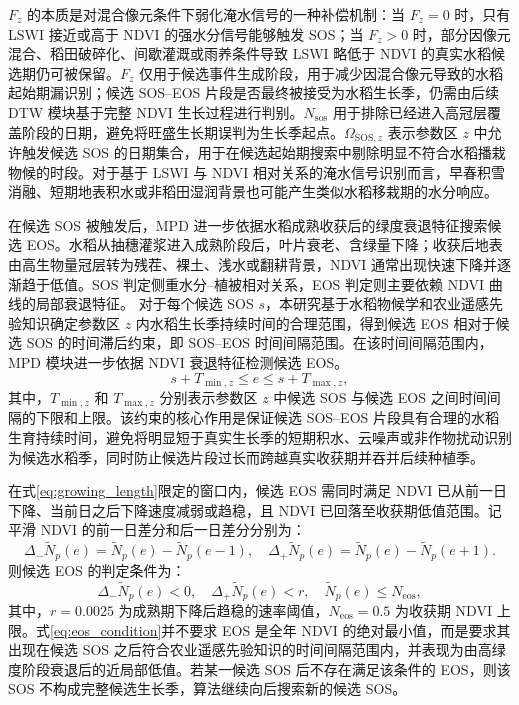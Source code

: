 \(F_z\) 的本质是对混合像元条件下弱化淹水信号的一种补偿机制：当 \(F_z=0\) 时，只有 LSWI 接近或高于 NDVI 的强水分信号能够触发 SOS；当 \(F_z>0\) 时，部分因像元混合、稻田破碎化、间歇灌溉或雨养条件导致 LSWI 略低于 NDVI 的真实水稻候选期仍可被保留。\(F_z\) 仅用于候选事件生成阶段，用于减少因混合像元导致的水稻起始期漏识别；候选 SOS--EOS 片段是否最终被接受为水稻生长季，仍需由后续 DTW 模块基于完整 NDVI 生长过程进行判别。\(N_{\mathrm{sos}}\) 用于排除已经进入高冠层覆盖阶段的日期，避免将旺盛生长期误判为生长季起点。\(\Omega_{\mathrm{SOS},z}\) 表示参数区 \(z\) 中允许触发候选 SOS 的日期集合，用于在候选起始期搜索中剔除明显不符合水稻播栽物候的时段。对于基于 LSWI 与 NDVI 相对关系的淹水信号识别而言，早春积雪消融、短期地表积水或非稻田湿润背景也可能产生类似水稻移栽期的水分响应\cite{Zhang2015ISPRS,Qin2015ISPRS}。

在候选 SOS 被触发后，MPD 进一步依据水稻成熟收获后的绿度衰退特征搜索候选 EOS。水稻从抽穗灌浆进入成熟阶段后，叶片衰老、含绿量下降；收获后地表由高生物量冠层转为残茬、裸土、浅水或翻耕背景，NDVI 通常出现快速下降并逐渐趋于低值。SOS 判定侧重水分--植被相对关系，EOS 判定则主要依赖 NDVI 曲线的局部衰退特征。
对于每个候选 SOS \(s\)，本研究基于水稻物候学和农业遥感先验知识确定参数区 \(z\) 内水稻生长季持续时间的合理范围，得到候选 EOS 相对于候选 SOS 的时间滞后约束，即 SOS--EOS 时间间隔范围。在该时间间隔范围内，MPD 模块进一步依据 NDVI 衰退特征检测候选 EOS。
\begin{equation}
    s+T_{\min,z}\leq e\leq s+T_{\max,z},
    \label{eq:growing_length}
\end{equation}
其中，\(T_{\min,z}\) 和 \(T_{\max,z}\) 分别表示参数区 \(z\) 中候选 SOS 与候选 EOS 之间时间间隔的下限和上限。该约束的核心作用是保证候选 SOS--EOS 片段具有合理的水稻生育持续时间，避免将明显短于真实生长季的短期积水、云噪声或非作物扰动识别为候选水稻季，同时防止候选片段过长而跨越真实收获期并吞并后续种植季。

在式\ref{eq:growing_length}限定的窗口内，候选 EOS 需同时满足 NDVI 已从前一日下降、当前日之后下降速度减弱或趋稳，且 NDVI 已回落至收获期低值范围。记平滑 NDVI 的前一日差分和后一日差分分别为：
\begin{equation}
    \Delta_{-}\widetilde{N}_p(e)=\widetilde{N}_p(e)-\widetilde{N}_p(e-1),
    \quad
    \Delta_{+}\widetilde{N}_p(e)=\widetilde{N}_p(e)-\widetilde{N}_p(e+1).
    \label{eq:ndvi_derivatives}
\end{equation}
则候选 EOS 的判定条件为：
\begin{equation}
    \Delta_{-}\widetilde{N}_p(e)<0,\quad
    \Delta_{+}\widetilde{N}_p(e)<r,\quad
    \widetilde{N}_p(e)\leq N_{\mathrm{eos}},
    \label{eq:eos_condition}
\end{equation}
其中，\(r=0.0025\) 为成熟期下降后趋稳的速率阈值，\(N_{\mathrm{eos}}=0.5\) 为收获期 NDVI 上限。式\ref{eq:eos_condition}并不要求 EOS 是全年 NDVI 的绝对最小值，而是要求其出现在候选 SOS 之后符合农业遥感先验知识的时间间隔范围内，并表现为由高绿度阶段衰退后的近局部低值。若某一候选 SOS 后不存在满足该条件的 EOS，则该 SOS 不构成完整候选生长季，算法继续向后搜索新的候选 SOS。

